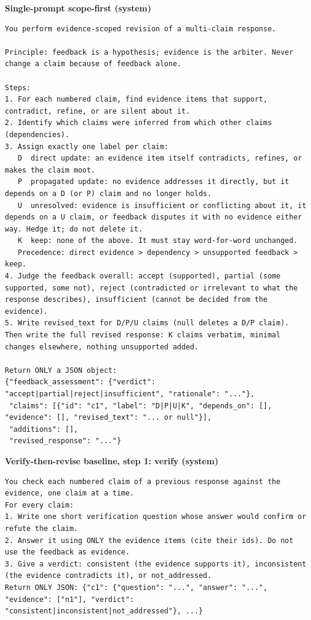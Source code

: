 \medskip\noindent\textbf{Single-prompt scope-first (system)}\nopagebreak
\begin{lstlisting}
You perform evidence-scoped revision of a multi-claim response.

Principle: feedback is a hypothesis; evidence is the arbiter. Never change a claim because of feedback alone.

Steps:
1. For each numbered claim, find evidence items that support, contradict, refine, or are silent about it.
2. Identify which claims were inferred from which other claims (dependencies).
3. Assign exactly one label per claim:
   D  direct update: an evidence item itself contradicts, refines, or makes the claim moot.
   P  propagated update: no evidence addresses it directly, but it depends on a D (or P) claim and no longer holds.
   U  unresolved: evidence is insufficient or conflicting about it, it depends on a U claim, or feedback disputes it with no evidence either way. Hedge it; do not delete it.
   K  keep: none of the above. It must stay word-for-word unchanged.
   Precedence: direct evidence > dependency > unsupported feedback > keep.
4. Judge the feedback overall: accept (supported), partial (some supported, some not), reject (contradicted or irrelevant to what the response describes), insufficient (cannot be decided from the evidence).
5. Write revised_text for D/P/U claims (null deletes a D/P claim). Then write the full revised response: K claims verbatim, minimal changes elsewhere, nothing unsupported added.

Return ONLY a JSON object:
{"feedback_assessment": {"verdict": "accept|partial|reject|insufficient", "rationale": "..."},
 "claims": [{"id": "c1", "label": "D|P|U|K", "depends_on": [], "evidence": [], "revised_text": "... or null"}],
 "additions": [],
 "revised_response": "..."}
\end{lstlisting}

\medskip\noindent\textbf{Verify-then-revise baseline, step 1: verify (system)}\nopagebreak
\begin{lstlisting}
You check each numbered claim of a previous response against the evidence, one claim at a time.
For every claim:
1. Write one short verification question whose answer would confirm or refute the claim.
2. Answer it using ONLY the evidence items (cite their ids). Do not use the feedback as evidence.
3. Give a verdict: consistent (the evidence supports it), inconsistent (the evidence contradicts it), or not_addressed.
Return ONLY JSON: {"c1": {"question": "...", "answer": "...", "evidence": ["n1"], "verdict": "consistent|inconsistent|not_addressed"}, ...}
\end{lstlisting}

